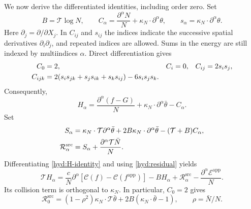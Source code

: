 We now derive the differentiated identities, including order zero. Set
\[
 B=\mathcal T\log N,\qquad
 C_\alpha=\frac{\partial^\alpha N}{N}
                      +\kappa_N\cdot\partial^\alpha\theta,
 \qquad s_\alpha=\kappa_N\cdot\partial^\alpha\theta.
\]
Here $\partial_j=\partial/\partial X_j$. In $C_{ij}$ and $s_{ij}$ the
indices indicate the successive spatial derivatives
$\partial_i\partial_j$, and repeated indices are allowed. Sums in the
energy are still indexed by multiindices $\alpha$. Direct differentiation
gives
\begin{align}
 C_0&=2,& C_i&=0,& C_{ij}&=2s_is_j,\notag\\
 C_{ijk}&=2(s_is_{jk}+s_js_{ik}+s_ks_{ij})-6s_is_js_k.
 \label{hyd:B-jets}
\end{align}
Consequently,
\begin{equation}\label{hyd:H-identity}
 H_\alpha=\frac{\partial^\alpha(f-G)}N
                 +\kappa_N\cdot\partial^\alpha\bar\theta-C_\alpha.
\end{equation}
Set
\begin{align}
 S_\alpha&=\kappa_N\cdot\mathcal T\partial^\alpha\bar\theta
       +2B\kappa_N\cdot\partial^\alpha\bar\theta
       -(\mathcal T+B)C_\alpha,\notag\\
 \mathcal R_\alpha^{\mathrm{src}}&=S_\alpha+\frac{\partial^\alpha\mathcal T\bar N}{N}.
 \label{hyd:R-definition}
\end{align}
Differentiating \eqref{hyd:H-identity} and using \eqref{hyd:residual}
yields
\begin{equation}\label{hyd:H-equation}
 \mathcal TH_\alpha
 =\frac cN\partial^\alpha[\mathcal C(f)-\mathcal C(f^{\mathrm{app}})]
      -BH_\alpha+\mathcal R_\alpha^{\mathrm{src}}-
       \frac{\partial^\alpha\mathcal E^{\mathrm{app}}}{N}.
\end{equation}
Its collision term is orthogonal to $\kappa_N$. In particular, $C_0=2$
gives
\begin{equation}\label{hyd:R-zero}
 \mathcal R_0^{\mathrm{src}}=(1-\rho^2)\kappa_N\cdot\mathcal T\bar\theta
          +2B(\kappa_N\cdot\bar\theta-1),\qquad \rho=\bar N/N.
\end{equation}


